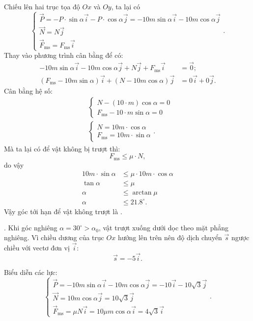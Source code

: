 Chiếu lên hai trục tọa độ $Ox$ và $Oy$, ta lại có
\begin{equation*}
   \begin{cases}
      \vec{P} = - P \cdot \sin\alpha \vec{i} -  P \cdot \cos\alpha \vec{j} = - 10m\sin\alpha \vec{i} -  10m\cos\alpha \vec{j} \\
      \vec{N} = N \vec{j} \\
      \vec{F}_{\text{ms}} = F_{\text{ms}} \vec{i}
   \end{cases}.
\end{equation*}
Thay vào phương trình cân bằng để có:
\begin{align*}
   - 10m\sin\alpha \vec{i} -  10m\cos\alpha \vec{j} + N \vec{j} + F_{\text{ms}} \vec{i} &= \vec{0}; \\
   \left(F_{\text{ms}} - 10m\sin\alpha\right) \vec{i} + (N - 10m\cos\alpha) \vec{j} &= 0\vec{i} + 0\vec{j}.
\end{align*}
Cân bằng hệ số:
\begin{align*}
& \begin{cases}
N - (10 \cdot m)\cos\alpha = 0 \\
F_{\text{ms}} - 10 \cdot m\sin\alpha = 0
\end{cases} \\
& \begin{cases}
N = 10m \cdot \cos\alpha \\
F_{\text{ms}} = 10m \cdot \sin\alpha
\end{cases}.
\end{align*}
Mà ta lại có để vật không bị trượt thì:
\begin{equation*}
F_{\text{ms}} \le \mu \cdot N,
\end{equation*}
do vậy
\begin{align*}
10m \cdot \sin\alpha &\le \mu \cdot 10m \cdot \cos\alpha \\
\tan\alpha &\le \mu \\
\alpha &\le \arctan\mu \\
\alpha &\le \num{21.8}^\circ.
\end{align*}
Vậy góc tới hạn để vật không trượt là .

. Khi góc nghiêng $\alpha = 30^\circ > \alpha_0$, vật trượt xuống dưới dọc theo mặt phẳng nghiêng. Vì chiều dương của trục $Ox$ hướng lên trên nên
độ dịch chuyển $\vec{s}$ ngược chiều với vectơ đơn vị $\vec{i}$:
$$\vec{s} = -5 \vec{i}.$$

Biểu diễn các lực:
\begin{equation*} \begin{cases} \vec{P} = - 10m\sin\alpha \vec{i}
   - 10m\cos\alpha \vec{j} = -10 \vec{i} - 10\sqrt{3} \vec{j} \\ 
   \vec{N} = 10m\cos\alpha \vec{j} = 10\sqrt{3} \vec{j}\\ 
   \vec{F}_{\text{ms}}
   = \mu N \vec{i} = 10\mu m\cos\alpha \vec{i} = 4\sqrt{3} \vec{i}
   \end{cases}. 
\end{equation*}

